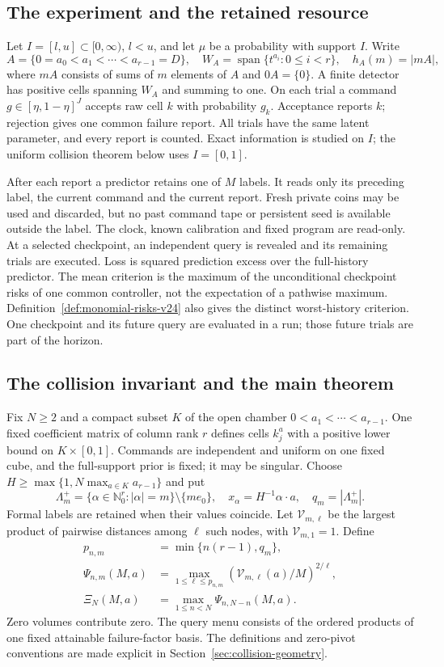 \subsection{The experiment and the retained resource}
Let $I=[l,u]\subset[0,\infty)$, $l<u$, and let $\mu$ be a probability
with support $I$. Write
\[
 A=\{0=a_0<a_1<\cdots<a_{r-1}=D\},\quad
 W_A=\operatorname{span}\{t^{a_i}:0\le i<r\},\quad h_A(m)=|mA|,
\]
where $mA$ consists of sums of $m$ elements of $A$ and $0A=\{0\}$.
A finite detector has positive cells spanning $W_A$ and summing to one.
On each trial a command $g\in[\eta,1-\eta]^J$ accepts raw cell $k$
with probability $g_k$. Acceptance reports $k$; rejection gives one
common failure report. All trials have the same latent parameter, and
every report is counted. Exact information is studied on $I$; the
uniform collision theorem below uses $I=[0,1]$.

After each report a predictor retains one of $M$ labels. It reads only
its preceding label, the current command and the current report.
Fresh private coins may be used and discarded, but no past command
tape or persistent seed is available outside the label. The clock,
known calibration and fixed program are read-only. At a selected
checkpoint, an independent query is revealed and its remaining trials
are executed. Loss is squared prediction excess over the full-history
predictor. The mean criterion is the maximum of the unconditional
checkpoint risks of one common controller, not the expectation of a
pathwise maximum. Definition~\ref{def:monomial-risks-v24} also gives
the distinct worst-history criterion. One checkpoint and its future
query are evaluated in a run; those future trials are part of the horizon.

\subsection{The collision invariant and the main theorem}
Fix $N\ge2$ and a compact subset $K$ of the open chamber
$0<a_1<\cdots<a_{r-1}$. One fixed coefficient matrix of column rank
$r$ defines cells $k_j^a$ with a positive lower bound on
$K\times[0,1]$. Commands are independent and uniform on one fixed
cube, and the full-support prior is fixed; it may be singular. Choose
$H\ge\max\{1,N\max_{a\in K}a_{r-1}\}$ and put
\[
 \Lambda_m^+=\{\alpha\in\mathbb N_0^r:|\alpha|=m\}\setminus\{me_0\},
 \quad x_\alpha=H^{-1}\alpha\cdot a,\quad q_m=|\Lambda_m^+|.
\]
Formal labels are retained when their values coincide. Let
$\mathcal V_{m,\ell}$ be the largest product of pairwise distances
among $\ell$ such nodes, with $\mathcal V_{m,1}=1$. Define
\[
 \begin{split}
 p_{n,m}&=\min\{n(r-1),q_m\},\\
 \Psi_{n,m}(M,a)&=\max_{1\le\ell\le p_{n,m}}
                   (\mathcal V_{m,\ell}(a)/M)^{2/\ell},\\
 \Xi_N(M,a)&=\max_{1\le n<N}\Psi_{n,N-n}(M,a).
 \end{split}
\]
Zero volumes contribute zero. The query menu consists of the ordered
products of one fixed attainable failure-factor basis. The definitions
and zero-pivot conventions are made explicit in
Section~\ref{sec:collision-geometry}.

